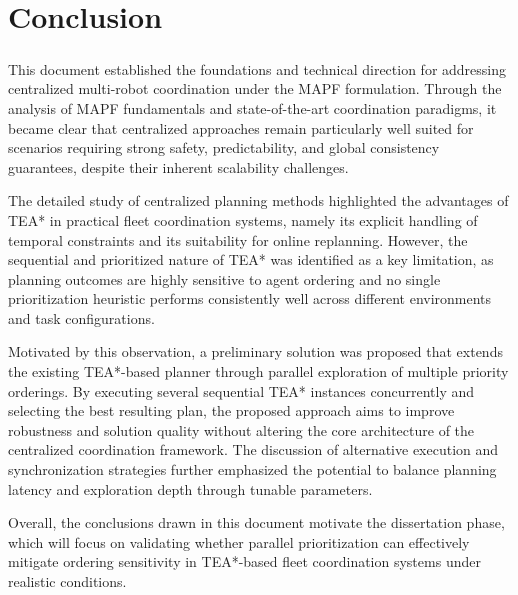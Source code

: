 \chapter{Conclusion} \label{chap:ch5}
\paragraph{}


This document established the foundations and technical direction for addressing centralized multi-robot coordination under the MAPF formulation. Through the analysis of MAPF fundamentals and state-of-the-art coordination paradigms, it became clear that centralized approaches remain particularly well suited for scenarios requiring strong safety, predictability, and global consistency guarantees, despite their inherent scalability challenges.

The detailed study of centralized planning methods highlighted the advantages of TEA* in practical fleet coordination systems, namely its explicit handling of temporal constraints and its suitability for online replanning. However, the sequential and prioritized nature of TEA* was identified as a key limitation, as planning outcomes are highly sensitive to agent ordering and no single prioritization heuristic performs consistently well across different environments and task configurations.

Motivated by this observation, a preliminary solution was proposed that extends the existing TEA*-based planner through parallel exploration of multiple priority orderings. By executing several sequential TEA* instances concurrently and selecting the best resulting plan, the proposed approach aims to improve robustness and solution quality without altering the core architecture of the centralized coordination framework. The discussion of alternative execution and synchronization strategies further emphasized the potential to balance planning latency and exploration depth through tunable parameters.

Overall, the conclusions drawn in this document motivate the dissertation phase, which will focus on validating whether parallel prioritization can effectively mitigate ordering sensitivity in TEA*-based fleet coordination systems under realistic conditions.